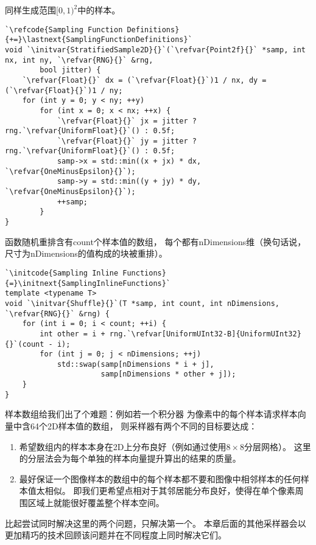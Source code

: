 同样生成范围$[0,1)^2$中的样本。
\begin{lstlisting}
`\refcode{Sampling Function Definitions}{+=}\lastnext{SamplingFunctionDefinitions}`
void `\initvar{StratifiedSample2D}{}`(`\refvar{Point2f}{}` *samp, int nx, int ny, `\refvar{RNG}{}` &rng,
        bool jitter) {
    `\refvar{Float}{}` dx = (`\refvar{Float}{}`)1 / nx, dy = (`\refvar{Float}{}`)1 / ny;
    for (int y = 0; y < ny; ++y)
        for (int x = 0; x < nx; ++x) {
            `\refvar{Float}{}` jx = jitter ? rng.`\refvar{UniformFloat}{}`() : 0.5f;
            `\refvar{Float}{}` jy = jitter ? rng.`\refvar{UniformFloat}{}`() : 0.5f;
            samp->x = std::min((x + jx) * dx, `\refvar{OneMinusEpsilon}{}`);
            samp->y = std::min((y + jy) * dy, `\refvar{OneMinusEpsilon}{}`);
            ++samp;
        }
}
\end{lstlisting}

函数随机重排含有{\ttfamily count}个样本值的数组，
每个都有{\ttfamily nDimensions}维（换句话说，
尺寸为{\ttfamily nDimensions}的值构成的块被重排）。
\begin{lstlisting}
`\initcode{Sampling Inline Functions}{=}\initnext{SamplingInlineFunctions}`
template <typename T>
void `\initvar{Shuffle}{}`(T *samp, int count, int nDimensions, `\refvar{RNG}{}` &rng) {
    for (int i = 0; i < count; ++i) {
        int other = i + rng.`\refvar[UniformUInt32-B]{UniformUInt32}{}`(count - i);
        for (int j = 0; j < nDimensions; ++j)
            std::swap(samp[nDimensions * i + j],
                      samp[nDimensions * other + j]);
    }
}
\end{lstlisting}

样本数组给我们出了个难题：例如若一个积分器
为像素中的每个样本请求样本向量中含64个2D样本值的数组，
则采样器有两个不同的目标要达成：
\begin{enumerate}
    \item 希望数组内的样本本身在2D上分布良好（例如通过使用$8\times8$分层网格）。
          这里的分层法会为每个单独的样本向量提升算出的结果的质量。
    \item 最好保证一个图像样本的数组中的每个样本都不要和图像中相邻样本的任何样本值太相似。
          即我们更希望点相对于其邻居能分布良好，使得在单个像素周围区域上就能很好覆盖整个样本空间。
\end{enumerate}

比起尝试同时解决这里的两个问题，只解决第一个。
本章后面的其他采样器会以更加精巧的技术回顾该问题并在不同程度上同时解决它们。

